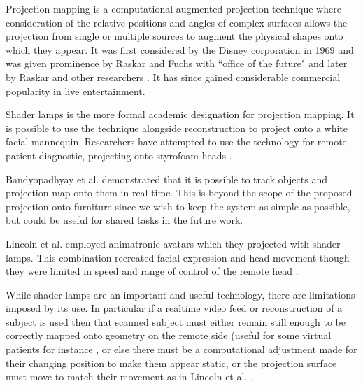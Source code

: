 Projection mapping is a computational augmented projection technique where consideration of the relative positions and angles of complex surfaces allows the projection from single or multiple sources to augment the physical shapes onto which they appear. It was first considered by the \href{https://rabcup.com/the-history-of-3d-projection-mapping/}{Disney corporation in 1969} and was given prominence by Raskar and Fuchs with ``office of the future" \cite{Raskar1998} and later by Raskar and other researchers \cite{Raskar2001}. It has since gained considerable commercial popularity in live entertainment.\par
                    Shader lamps \cite{Raskar2001} is the more formal academic designation for projection mapping. It is possible to use the technique alongside reconstruction to project onto a white facial mannequin. Researchers have attempted to use the technology for remote patient diagnostic, projecting onto styrofoam heads  \cite{Rivera-Gutierrez2012}.\par          
                     Bandyopadhyay et al. demonstrated \cite{Bandyopadhyay2001} that it is possible to track objects and projection map \cite{Dalsgaard2011} onto them in real time. This is beyond the scope of the proposed projection onto furniture since we wish to keep the system as simple as possible, but could be useful for shared tasks in the future work.\par
                    Lincoln et al. employed animatronic avatars which they projected with shader lamps. This combination recreated facial expression and head movement though they were limited in speed and range of control of the remote head \cite{Lincoln2010}.\par
                    While shader lamps are an important and useful technology, there are limitations imposed by its use. In particular if a realtime video feed or reconstruction of a subject is used then that scanned subject must either remain still enough to be correctly mapped onto geometry on the remote side (useful for some virtual patients for instance \cite{Benjamin2012}, or else there must be a computational adjustment made for their changing position to make them appear static, or the projection surface must move to match their movement as in Lincoln et al. .
   

